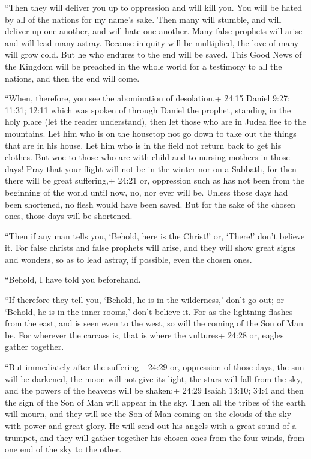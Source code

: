  ``Then they will deliver you up to oppression and will kill
you. You will be hated by all of the nations for my name's sake.
 Then many will stumble, and will deliver up one another,
and will hate one another.  Many false prophets will arise
and will lead many astray.  Because iniquity will be
multiplied, the love of many will grow cold.  But he who
endures to the end will be saved.  This Good News of the
Kingdom will be preached in the whole world for a testimony to all the
nations, and then the end will come.

 ``When, therefore, you see the abomination of desolation,+
24:15 Daniel 9:27; 11:31; 12:11 which was spoken of through Daniel the
prophet, standing in the holy place (let the reader understand),
 then let those who are in Judea flee to the mountains.
 Let him who is on the housetop not go down to take out the
things that are in his house.  Let him who is in the field
not return back to get his clothes.  But woe to those who
are with child and to nursing mothers in those days!  Pray
that your flight will not be in the winter nor on a Sabbath,
 for then there will be great suffering,+ 24:21 or,
oppression such as has not been from the beginning of the world until
now, no, nor ever will be.  Unless those days had been
shortened, no flesh would have been saved. But for the sake of the
chosen ones, those days will be shortened.

 ``Then if any man tells you, `Behold, here is the Christ!'
or, `There!' don't believe it.  For false christs and false
prophets will arise, and they will show great signs and wonders, so as
to lead astray, if possible, even the chosen ones.

 ``Behold, I have told you beforehand.

 ``If therefore they tell you, `Behold, he is in the
wilderness,' don't go out; or `Behold, he is in the inner rooms,' don't
believe it.  For as the lightning flashes from the east,
and is seen even to the west, so will the coming of the Son of Man be.
 For wherever the carcass is, that is where the vultures+
24:28 or, eagles gather together.

 ``But immediately after the suffering+ 24:29 or,
oppression of those days, the sun will be darkened, the moon will not
give its light, the stars will fall from the sky, and the powers of the
heavens will be shaken;+ 24:29 Isaiah 13:10; 34:4  and then
the sign of the Son of Man will appear in the sky. Then all the tribes
of the earth will mourn, and they will see the Son of Man coming on the
clouds of the sky with power and great glory.  He will send
out his angels with a great sound of a trumpet, and they will gather
together his chosen ones from the four winds, from one end of the sky to
the other.

